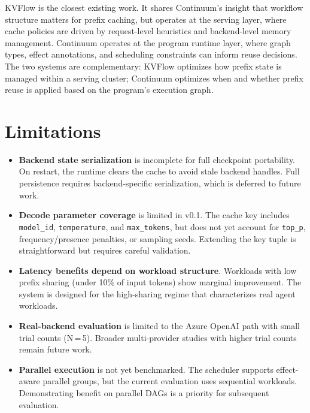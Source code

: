 \documentclass[10pt,twocolumn]{article}
\begin{document}
KVFlow \cite{pan2025kvflow} is the closest existing work. It shares Continuum's insight that workflow structure matters for prefix caching, but operates at the serving layer, where cache policies are driven by request-level heuristics and backend-level memory management. Continuum operates at the program runtime layer, where graph types, effect annotations, and scheduling constraints can inform reuse decisions. The two systems are complementary: KVFlow optimizes how prefix state is managed within a serving cluster; Continuum optimizes when and whether prefix reuse is applied based on the program's execution graph.

\section{Limitations}

\begin{itemize}[leftmargin=*]
  \item \textbf{Backend state serialization} is incomplete for full checkpoint portability. On restart, the runtime clears the cache to avoid stale backend handles. Full persistence requires backend-specific serialization, which is deferred to future work.
  \item \textbf{Decode parameter coverage} is limited in v0.1. The cache key includes \texttt{model\_id}, \texttt{temperature}, and \texttt{max\_tokens}, but does not yet account for \texttt{top\_p}, frequency/presence penalties, or sampling seeds. Extending the key tuple is straightforward but requires careful validation.
  \item \textbf{Latency benefits depend on workload structure}. Workloads with low prefix sharing (under 10\% of input tokens) show marginal improvement. The system is designed for the high-sharing regime that characterizes real agent workloads.
  \item \textbf{Real-backend evaluation} is limited to the Azure OpenAI path with small trial counts (N\,=\,5). Broader multi-provider studies with higher trial counts remain future work.
  \item \textbf{Parallel execution} is not yet benchmarked. The scheduler supports effect-aware parallel groups, but the current evaluation uses sequential workloads. Demonstrating benefit on parallel DAGs is a priority for subsequent evaluation.
\end{itemize}
\end{document}
